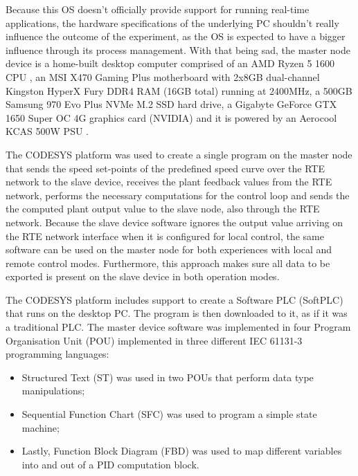 Because this OS doesn't officially provide support for running real-time applications, the hardware specifications of the underlying PC shouldn't really influence the outcome of the experiment, as the OS is expected to have a bigger influence through its process management.
With that being sad, the master node device is a home-built desktop computer comprised of an AMD Ryzen\texttrademark{} 5 1600 CPU \cite{hdw:ryzen5-1600}, an MSI X470 Gaming Plus \cite{hdw:msi-x470} motherboard with 2x8GB dual-channel Kingston HyperX Fury DDR4 RAM (16GB total) \cite{hdw:hyperx-fury-8gb-ddr4-2400} running at 2400MHz, a 500GB Samsung 970 Evo Plus NVMe\textregistered{} M.2 SSD \cite{hdw:970evo-plus-ssd} hard drive, a Gigabyte GeForce\textregistered{} GTX 1650 Super\texttrademark{} OC 4G \cite{hdw:gigabyte-1650-super-oc} graphics card (NVIDIA) and it is powered by an Aerocool KCAS 500W PSU \cite{hdw:kcas-500w}.

The CODESYS platform was used to create a single program on the master node that sends the speed set-points of the predefined speed curve over the RTE network to the slave device, receives the plant feedback values from the RTE network, performs the necessary computations for the control loop and sends the the computed plant output value to the slave node, also through the RTE network.
Because the slave device software ignores the output value arriving on the RTE network interface when it is configured for local control, the same software can be used on the master node for both experiences with local and remote control modes.
Furthermore, this approach makes sure all data to be exported is present on the slave device in both operation modes.

The CODESYS platform includes support to create a Software PLC (SoftPLC) that runs on the desktop PC.
The program is then downloaded to it, as if it was a traditional PLC.
The master device software was implemented in four Program Organisation Unit (POU) implemented in three different IEC 61131-3 programming languages: 
\begin{itemize}
	\item Structured Text (ST) was used in two POUs that perform data type manipulations;
	\item Sequential Function Chart (SFC) was used to program a simple state machine;
	\item Lastly, Function Block Diagram (FBD) was used to map different variables into and out of a PID computation block.
\end{itemize}

